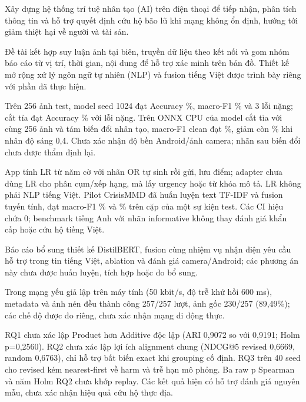 
Xây dựng hệ thống trí tuệ nhân tạo (AI) trên điện thoại để tiếp nhận, phân tích thông tin và hỗ trợ quyết định cứu hộ bão lũ khi mạng không ổn định, hướng tới giảm thiệt hại về người và tài sản.

Đề tài kết hợp suy luận ảnh tại biên, truyền dữ liệu theo kết nối và gom nhóm báo cáo từ vị trí, thời gian, nội dung để hỗ trợ xác minh trên bản đồ. Thiết kế mở rộng xử lý ngôn ngữ tự nhiên (NLP) và fusion tiếng Việt được trình bày riêng với phần đã thực hiện.

Trên 256 ảnh test, model seed 1024 đạt Accuracy \NewImageAccuracy\%, macro-F1 \NewImageMacroFOne\% và 3 lỗi nặng; cắt tỉa đạt Accuracy \PruningAccuracy\% với \PruningCriticalCount{} lỗi nặng. Trên ONNX CPU của model cắt tỉa với cùng 256 ảnh và tám biến đổi nhân tạo, macro-F1 clean đạt \QualityCleanMacroFOne\%, giảm còn \QualityDarkMacroFOne\% khi nhân độ sáng 0,4. Chưa xác nhận độ bền Android/ảnh camera; nhãn sau biến đổi chưa được thẩm định lại.

App tính LR từ năm cờ với nhãn OR tự sinh rồi gửi, lưu điểm; adapter chưa dùng LR cho phân cụm/xếp hạng, mà lấy urgency hoặc từ khóa mô tả. LR không phải NLP tiếng Việt. Pilot CrisisMMD đã huấn luyện text TF-IDF và fusion tuyến tính, đạt macro-F1 \MMTextFOne\% và \MMFusionFOne\% trên \MMTestN{} cặp của một sự kiện test. Các CI hiệu chứa 0; benchmark tiếng Anh với nhãn informative không thay đánh giá khẩn cấp hoặc cứu hộ tiếng Việt.

Báo cáo bổ sung thiết kế DistilBERT, fusion cùng nhiệm vụ nhận diện yêu cầu hỗ trợ trong tin tiếng Việt, ablation và đánh giá camera/Android; các phương án này chưa được huấn luyện, tích hợp hoặc đo bổ sung.

Trong mạng yếu giả lập trên máy tính (50 kbit/s, độ trễ khứ hồi 600 ms), metadata và ảnh nén đều thành công 257/257 lượt, ảnh gốc 230/257 (89,49\%); các chế độ được đo riêng, chưa xác nhận mạng di động thực.

RQ1 chưa xác lập Product hơn Additive độc lập (ARI 0,9072 so với 0,9191; Holm p=0,2560). RQ2 chưa xác lập lợi ích alignment chung (NDCG@5 revised 0,6669, random 0,6763), chỉ hỗ trợ bất biến exact khi grouping cố định. RQ3 trên 40 seed cho revised kém nearest-first về harm và trễ hạn mô phỏng. Ba raw p Spearman và năm Holm RQ2 chưa khớp replay. Các kết quả hiện có hỗ trợ đánh giá nguyên mẫu, chưa xác nhận hiệu quả cứu hộ thực địa.

